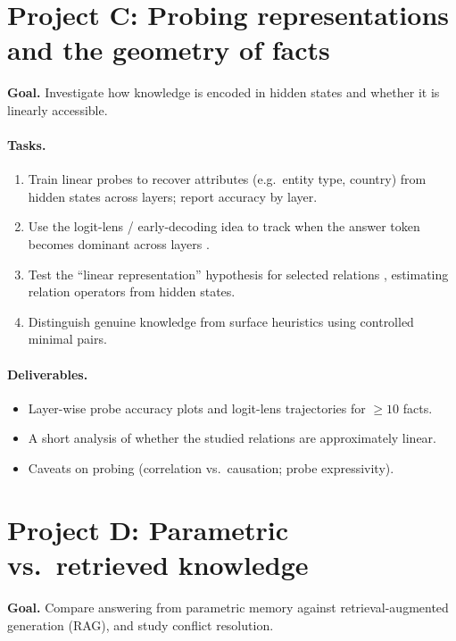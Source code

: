 \documentclass[11pt]{article}
\begin{document}
\section{Project C: Probing representations and the geometry of facts}
\textbf{Goal.} Investigate how knowledge is encoded in hidden states and whether it is linearly accessible.

\paragraph{Tasks.}
\begin{enumerate}[leftmargin=*]
  \item Train linear probes to recover attributes (e.g.\ entity type, country) from hidden states across layers; report accuracy by layer.
  \item Use the logit-lens / early-decoding idea to track when the answer token becomes dominant across layers \citep{nostalgebraist2020logitlens,geva2022promoting}.
  \item Test the ``linear representation'' hypothesis for selected relations \citep{hernandez2024linearity}, estimating relation operators from hidden states.
  \item Distinguish genuine knowledge from surface heuristics using controlled minimal pairs.
\end{enumerate}

\paragraph{Deliverables.}
\begin{itemize}[leftmargin=*]
  \item Layer-wise probe accuracy plots and logit-lens trajectories for $\geq 10$ facts.
  \item A short analysis of whether the studied relations are approximately linear.
  \item Caveats on probing (correlation vs.\ causation; probe expressivity).
\end{itemize}

\section{Project D: Parametric vs.\ retrieved knowledge}
\textbf{Goal.} Compare answering from parametric memory against retrieval-augmented generation (RAG), and study conflict resolution.
\end{document}
